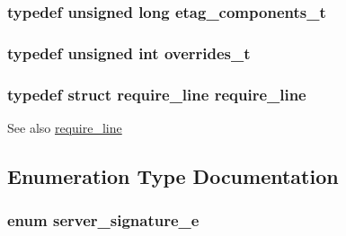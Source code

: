 \subsubsection[{\texorpdfstring{etag\+\_\+components\+\_\+t}{etag_components_t}}]{\setlength{\rightskip}{0pt plus 5cm}typedef unsigned long {\bf etag\+\_\+components\+\_\+t}}\hypertarget{group__APACHE__CORE__HTTPD_gaf3e69b939656940e28afaf69f5b186f9}{}\label{group__APACHE__CORE__HTTPD_gaf3e69b939656940e28afaf69f5b186f9}
\subsubsection[{\texorpdfstring{overrides\+\_\+t}{overrides_t}}]{\setlength{\rightskip}{0pt plus 5cm}typedef unsigned {\bf int} {\bf overrides\+\_\+t}}\hypertarget{group__APACHE__CORE__HTTPD_ga4c9d0f694a232ecee18b53bfe18a8ce6}{}\label{group__APACHE__CORE__HTTPD_ga4c9d0f694a232ecee18b53bfe18a8ce6}
\subsubsection[{\texorpdfstring{require\+\_\+line}{require_line}}]{\setlength{\rightskip}{0pt plus 5cm}typedef struct {\bf require\+\_\+line} {\bf require\+\_\+line}}\hypertarget{group__APACHE__CORE__HTTPD_gaa22be20e510863cf000b5466f16ce6d4}{}\label{group__APACHE__CORE__HTTPD_gaa22be20e510863cf000b5466f16ce6d4}
\begin{DoxySeeAlso}{See also}
\hyperlink{structrequire__line}{require\+\_\+line} 
\end{DoxySeeAlso}


\subsection{Enumeration Type Documentation}
\subsubsection[{\texorpdfstring{server\+\_\+signature\+\_\+e}{server_signature_e}}]{\setlength{\rightskip}{0pt plus 5cm}enum {\bf server\+\_\+signature\+\_\+e}}\hypertarget{group__APACHE__CORE__HTTPD_ga3d3075ad369a3acb6892c3e3c3aab522}{}\label{group__APACHE__CORE__HTTPD_ga3d3075ad369a3acb6892c3e3c3aab522}


